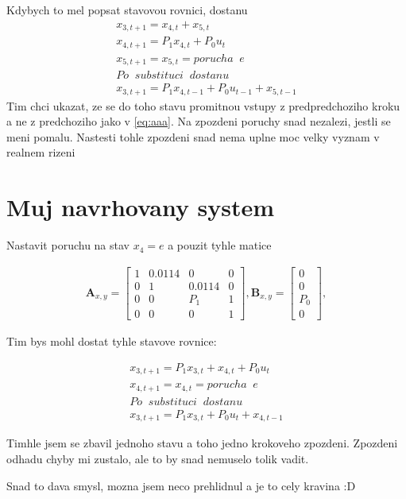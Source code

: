 \documentclass{article}
\begin{document}
Kdybych to mel popsat stavovou rovnici, dostanu
\begin{equation}
\begin{split}
x_{3, t+1} = x_{4, t} + x_{5, t} \\
x_{4, t+1} = P_1 x_{4, t}+P_0 u_t \\
x_{5, t+1} = x_{5, t} = porucha \;\;e\\
Po \;\;substituci \;\;dostanu \\
x_{3, t+1} = P_1 x_{4, t-1}+P_0 u_{t-1} + x_{5, t-1}
\end{split}
\end{equation}
Tim chci ukazat, ze se do toho stavu promitnou vstupy z predpredchoziho kroku a ne z predchoziho jako v \ref{eq:aaa}. Na zpozdeni poruchy snad nezalezi, jestli se meni pomalu. Nastesti tohle zpozdeni snad nema uplne moc velky vyznam v realnem rizeni

\section{Muj navrhovany system}

Nastavit poruchu na stav $x_4 = e$ a pouzit tyhle matice

\begin{equation}
\begin{split}
\mathbf{A}_{x, y} = \begin{bmatrix}
1 & 0.0114 & 0 & 0\\
0 & 1 & 0.0114 & 0\\
0 & 0 & P_1 & 1\\
0 & 0 & 0 & 1
\end{bmatrix}, \mathbf{B}_{x, y} = \begin{bmatrix}
0\\
0\\
P_0\\
0
\end{bmatrix},
\end{split}
\end{equation}

Tim bys mohl dostat tyhle stavove rovnice:

\begin{equation}
\begin{split}
x_{3, t+1} = P_1 x_{3, t} + x_{4, t} +P_0 u_t \\
x_{4, t+1} = x_{4, t} = porucha \;\;e\\
Po \;\;substituci \;\;dostanu \\
x_{3, t+1} = P_1 x_{3, t}+P_0 u_{t} + x_{4, t-1}
\end{split}
\end{equation}

Timhle jsem se zbavil jednoho stavu a toho jedno krokoveho zpozdeni. Zpozdeni odhadu chyby mi zustalo, ale to by snad nemuselo tolik vadit. 

Snad to dava smysl, mozna jsem neco prehlidnul a je to cely kravina :D
\end{document}
